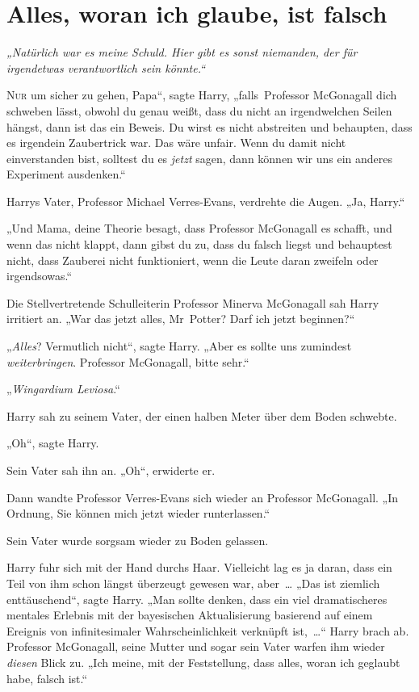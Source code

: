 \chapter{Alles, woran ich glaube, ist falsch}

\emph{„Natürlich war es meine Schuld. Hier gibt es sonst niemanden, der für irgendetwas verantwortlich sein könnte.“}

\later

\lettrine[ante=„]{N}{ur} um sicher zu gehen, Papa“, sagte Harry, „falls Professor McGonagall dich schweben lässt, obwohl du genau weißt, dass du nicht an irgendwelchen Seilen hängst, dann ist das ein Beweis. Du wirst es nicht abstreiten und behaupten, dass es irgendein Zaubertrick war. Das wäre unfair. Wenn du damit nicht einverstanden bist, solltest du es \emph{jetzt} sagen, dann können wir uns ein anderes Experiment ausdenken.“

Harrys Vater, Professor Michael Verres-Evans, verdrehte die Augen. „Ja, Harry.“

„Und Mama, deine Theorie besagt, dass Professor McGonagall es schafft, und wenn das nicht klappt, dann gibst du zu, dass du falsch liegst und behauptest nicht, dass Zauberei nicht funktioniert, wenn die Leute daran zweifeln oder irgendsowas.“

Die Stellvertretende Schulleiterin Professor Minerva McGonagall sah Harry irritiert an. „War das jetzt alles, Mr~Potter? Darf ich jetzt beginnen?“

„\emph{Alles}? Vermutlich nicht“, sagte Harry. „Aber es sollte uns zumindest \emph{weiterbringen}. Professor McGonagall, bitte sehr.“

„\emph{Wingardium Leviosa}.“

Harry sah zu seinem Vater, der einen halben Meter über dem Boden schwebte.

„Oh“, sagte Harry.

Sein Vater sah ihn an. „Oh“, erwiderte er.

Dann wandte Professor Verres-Evans sich wieder an Professor McGonagall. „In Ordnung, Sie können mich jetzt wieder runterlassen.“

Sein Vater wurde sorgsam wieder zu Boden gelassen.

Harry fuhr sich mit der Hand durchs Haar. Vielleicht lag es ja daran, dass ein Teil von ihm schon längst überzeugt gewesen war, aber … „Das ist ziemlich enttäuschend“, sagte Harry. „Man sollte denken, dass ein viel dramatischeres mentales Erlebnis mit der bayesischen Aktualisierung basierend auf einem Ereignis von infinitesimaler Wahrscheinlichkeit verknüpft ist, …“ Harry brach ab. Professor McGonagall, seine Mutter und sogar sein Vater warfen ihm wieder \emph{diesen} Blick zu. „Ich meine, mit der Feststellung, dass alles, woran ich geglaubt habe, falsch ist.“

